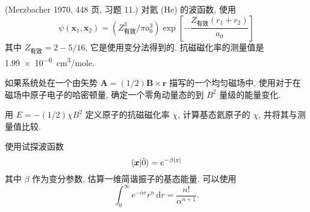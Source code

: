 \documentclass{assignment}
\begin{document}
\begin{prob}[课本习题 5.19]
    (Merzbacher 1970, 448 页, 习题 11.) 对氦 (He) 的波函数, 使用
    \[
        \psi(\bm{x}_1,\bm{x}_2)=(Z_{\text{有效}}^3/\pi a_0^3)\exp\left[-\frac{Z_{\text{有效}}(r_1+r_2)}{a_0}\right]
    \]
    其中 $Z_{\text{有效}}=2-5/16$, 它是使用变分法得到的. 抗磁磁化率的测量值是 \SI{1.99e-6}{cm^3/mole}.

    如果系统处在一个由矢势 $\bm{A}=(1/2)\bm{B}\times\bm{r}$ 描写的一个均匀磁场中, 使用对于在磁场中原子电子的哈密顿量, 确定一个零角动量态的到 $B^2$ 量级的能量变化.

    用 $E=-(1/2)\chi B^2$ 定义原子的抗磁磁化率 $\chi$, 计算基态氦原子的 $\chi$, 并将其与测量值比较.
\end{prob}
\begin{sol}
    
\end{sol}

\begin{prob}[课本习题 5.20]
    使用试探波函数
    \[
        \langle\bm{x}\vert\tilde{0}\rangle=e^{-\beta\left\lvert x\right\rvert}
    \]
    其中 $\beta$ 作为变分参数, 估算一维简谐振子的基态能量. 可以使用
    \[
        \int_0^{\infty}e^{-\alpha r}r^n\,\mathrm{d}r=\frac{n!}{\alpha^{n+1}}.
    \]
\end{prob}
\begin{sol}
    
\end{sol}
\end{document}
